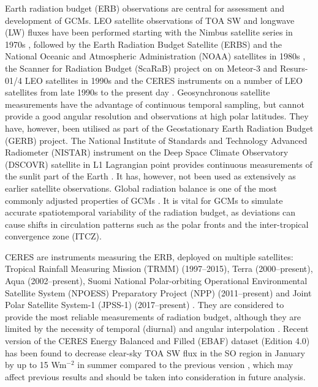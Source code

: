 Earth radiation budget (ERB) observations are central for assessment and development
of GCMs. LEO satellite observations of TOA SW and longwave (LW) fluxes
have been performed starting with the Nimbus satellite series in 1970s
\citep{smith1977}, followed by the Earth Radiation Budget Satellite (ERBS) and
the National Oceanic and Atmospheric Administration (NOAA)
satellites in 1980s \citep{barkstrom1984}, the Scanner for Radiation Budget (ScaRaB)
project on on Meteor-3 and Resurs-01/4 LEO satellites in 1990s \citep{kandel1994}
and the
CERES instruments on a number of LEO satellites from late 1990s
to the present day \citep{wielicki1996}. Geosynchronous satellite measurements
have the advantage of continuous temporal sampling, but cannot provide a
good angular resolution and observations at high polar latitudes. They have,
however, been utilised as part of the Geostationary Earth Radiation Budget (GERB)
project.
The National Institute of Standards and Technology Advanced Radiometer (NISTAR)
instrument on the Deep Space Climate Observatory (DSCOVR) satellite in L1 Lagrangian point provides continuous
measurements of the sunlit part of the Earth \citep{khlopenkov2017}. It has,
however, not been used
as extensively as earlier satellite observations. Global radiation balance
is one of the most commonly adjusted properties of GCMs
\citep{hourdin2017,schmidt2017}. It is vital for GCMs to simulate accurate
spatiotemporal variability of the radiation budget, as deviations can cause
shifts in circulation patterns such as the polar fronts and
the inter-tropical convergence zone (ITCZ).

CERES are instruments measuring the ERB,
deployed on multiple satellites:
Tropical Rainfall Measuring Mission (TRMM) (1997--2015),
Terra (2000--present), Aqua (2002--present), Suomi
National Polar-orbiting Operational Environmental Satellite System (NPOESS)
Preparatory Project (NPP) (2011--present) and Joint Polar Satellite System-1 (JPSS-1)
(2017--present) \citep{damadeo2017}. They are
considered to provide the most reliable measurements of radiation budget,
although they are limited by the necessity of temporal (diurnal) and angular
interpolation \citep{smith2011}.
Recent version of the CERES Energy Balanced and
Filled (EBAF) dataset (Edition 4.0) has been found to decrease
clear-sky TOA SW flux in the SO region in January by up to 15 Wm$^{-2}$
in summer compared to the previous version \citep{loeb2017},
which may affect previous results and should be taken into consideration in
future analysis.

